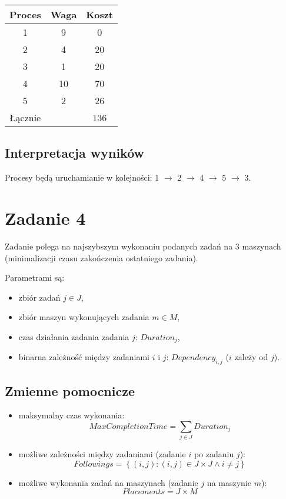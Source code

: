 \documentclass[polish,12pt,titlepage]{article}
\begin{document}
\begin{tabular}{ | c | c | c | }
	\hline
	Proces & Waga  & Koszt \\
	\hline
	1 & 9  & 0      \\
	2 & 4  & 20     \\
	3 & 1  & 20     \\
	4 & 10 & 70     \\
	5 & 2  & 26     \\
	\hline
	Łącznie & & 136 \\
	\hline
\end{tabular}

\subsection{Interpretacja wyników}

Procesy będą uruchamianie w kolejności: 1 $\rightarrow$ 2 $\rightarrow$ 4 $\rightarrow$ 5 $\rightarrow$ 3.


\section{Zadanie 4}

Zadanie polega na najszybszym wykonaniu podanych zadań na 3 maszynach (minimalizacji czasu zakończenia ostatniego zadania).

Parametrami są:
\begin{itemize}
	\item zbiór zadań $j \in J$,
	\item zbiór maszyn wykonujących zadania $m \in M$,
	\item czas działania zadania zadania $j$: $Duration_j$,
	\item binarna zależność między zadaniami $i$ i $j$: $Dependency_{i,j}$ ($i$ zależy od $j$).
\end{itemize}

\subsection{Zmienne pomocnicze}
\begin{itemize}
	\item maksymalny czas wykonania:
	$$MaxCompletionTime = \sum\limits_{j \in J} Duration_j$$
	\item możliwe zależności między zadaniami (zadanie $i$ po zadaniu $j$):
	$$Followings = \left\{ (i,j): (i,j) \in J \times J \land i \neq j \right\}$$
	\item możliwe wykonania zadań na maszynach (zadanie $j$ na maszynie $m$):
	$$Placements = J \times M$$
\end{itemize}
\end{document}
